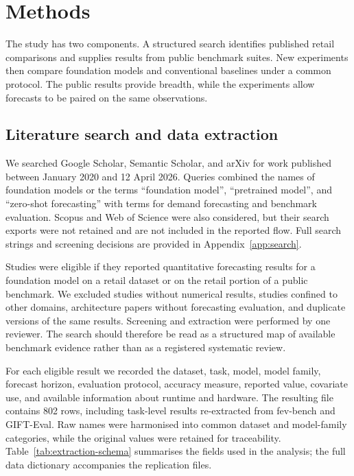 \section{Methods}
\label{sec:methodology}\label{sec:methods}

The study has two components. A structured search identifies published retail
comparisons and supplies results from public benchmark suites. New experiments
then compare foundation models and conventional baselines under a common
protocol. The public results provide breadth, while the experiments allow
forecasts to be paired on the same observations.

\subsection{Literature search and data extraction}
\label{subsec:search}

We searched Google Scholar, Semantic Scholar, and arXiv for work published
between January 2020 and 12 April 2026. Queries combined the names of
foundation models or the terms ``foundation model'', ``pretrained model'', and
``zero-shot forecasting'' with terms for demand forecasting and benchmark
evaluation. Scopus and Web of Science were also considered, but their search
exports were not retained and are not included in the reported flow. Full
search strings and screening decisions are provided in Appendix~\ref{app:search}.

Studies were eligible if they reported quantitative forecasting results for a
foundation model on a retail dataset or on the retail portion of a public
benchmark. We excluded studies without numerical results, studies confined to
other domains, architecture papers without forecasting evaluation, and
duplicate versions of the same results. Screening and extraction were
performed by one reviewer. The search should therefore be read as a structured
map of available benchmark evidence rather than as a registered systematic
review.

For each eligible result we recorded the dataset, task, model, model family,
forecast horizon, evaluation protocol, accuracy measure, reported value,
covariate use, and available information about runtime and hardware. The
resulting file contains 802 rows, including task-level results re-extracted
from fev-bench and GIFT-Eval. Raw names were harmonised into common dataset and
model-family categories, while the original values were retained for
traceability. Table~\ref{tab:extraction-schema} summarises the fields used in
the analysis; the full data dictionary accompanies the replication files.
\label{subsec:extraction}\label{sec:extraction-schema}

